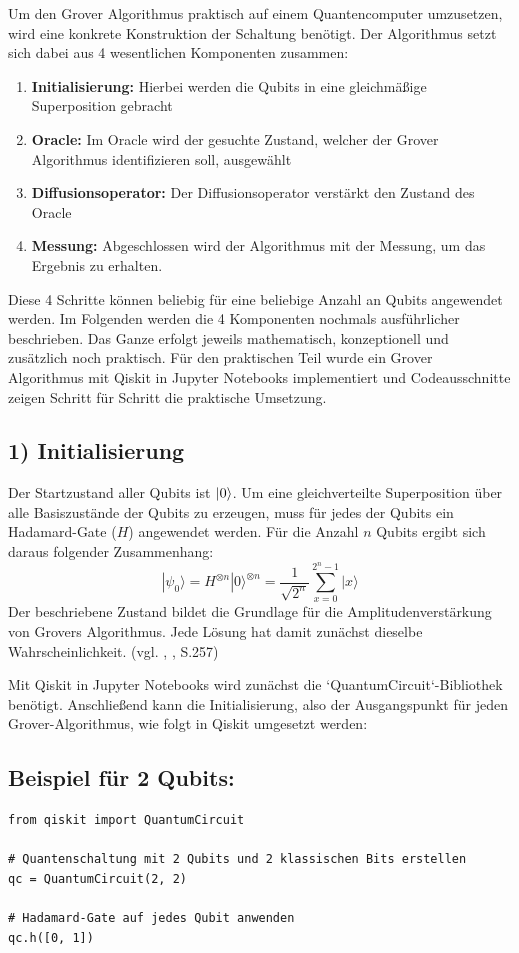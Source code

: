 Um den Grover Algorithmus praktisch auf einem Quantencomputer umzusetzen, wird eine konkrete Konstruktion der Schaltung benötigt. Der Algorithmus setzt sich dabei aus 4 wesentlichen Komponenten zusammen: 
\begin{enumerate}
    \item  \textbf{Initialisierung:} Hierbei werden die Qubits in eine gleichmäßige Superposition gebracht
    \item \textbf{Oracle:} Im Oracle wird der gesuchte Zustand, welcher der Grover Algorithmus identifizieren soll, ausgewählt
    \item \textbf{Diffusionsoperator:} Der Diffusionsoperator verstärkt den Zustand des Oracle
    \item   \textbf{Messung:} Abgeschlossen wird der Algorithmus mit der Messung, um das Ergebnis zu erhalten. 
\end{enumerate}

Diese 4 Schritte können beliebig für eine beliebige Anzahl an Qubits angewendet werden. Im Folgenden werden die 4 Komponenten nochmals ausführlicher beschrieben. Das Ganze erfolgt jeweils mathematisch, konzeptionell und zusätzlich noch praktisch. Für den praktischen Teil wurde ein Grover Algorithmus mit Qiskit in Jupyter Notebooks implementiert und Codeausschnitte zeigen Schritt für Schritt die praktische Umsetzung.

\subsection*{1) Initialisierung}
Der Startzustand aller Qubits ist $\ket{0}$. Um eine gleichverteilte Superposition über alle Basiszustände der Qubits zu erzeugen, muss für jedes der Qubits ein Hadamard-Gate ($H$) angewendet werden. Für die Anzahl $n$ Qubits ergibt sich daraus folgender Zusammenhang:
$$
|\psi_0\rangle = H^{\otimes n}|0\rangle^{\otimes n} = \frac{1}{\sqrt{2^n}} \sum_{x=0}^{2^n-1} |x\rangle
$$
Der beschriebene Zustand bildet die Grundlage für die Amplitudenverstärkung von Grovers Algorithmus. Jede Lösung hat damit zunächst dieselbe Wahrscheinlichkeit. (vgl. \citeauthor{nielsen_quantum_2010}, \citeyear{nielsen_quantum_2010}, S.257)

Mit Qiskit in Jupyter Notebooks wird zunächst die `QuantumCircuit`-Bibliothek benötigt. Anschließend kann die Initialisierung, also der Ausgangspunkt für jeden Grover-Algorithmus, wie folgt in Qiskit umgesetzt werden:
\subsection*{Beispiel für 2 Qubits:}
\begin{verbatim}
from qiskit import QuantumCircuit

# Quantenschaltung mit 2 Qubits und 2 klassischen Bits erstellen
qc = QuantumCircuit(2, 2)

# Hadamard-Gate auf jedes Qubit anwenden
qc.h([0, 1])


\end{verbatim}


